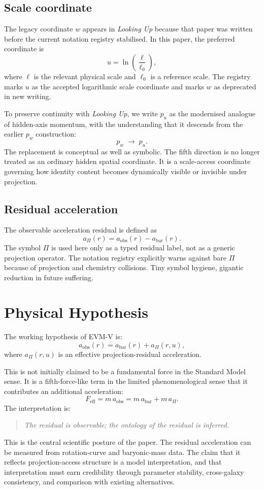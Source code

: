 \documentclass[11pt,a4paper,oneside]{article}
\newcommand{\aobs}{a_{\mathrm{obs}}}
\newcommand{\abar}{a_{\mathrm{bar}}}
\newcommand{\aPi}{a_{\Pi}}
\newcommand{\pu}{p_u}
\newcommand{\pw}{p_w}      %
\newcommand{\usc}{u}                    %
\newcommand{\ellz}{\ell_0}             %
\begin{document}
\subsection{Scale coordinate}

The legacy coordinate $w$ appears in \emph{Looking Up} because that paper was written
before the current notation registry stabilised. In this paper, the preferred coordinate
is
\[
    \usc = \ln\!\left(\frac{\ell}{\ellz}\right),
\]
where $\ell$ is the relevant physical scale and $\ellz$ is a reference scale. The
registry marks $\usc$ as the accepted logarithmic scale coordinate and marks $w$ as
deprecated in new writing.

To preserve continuity with \emph{Looking Up}, we write $\pu$ as the modernised analogue
of hidden-axis momentum, with the understanding that it descends from the earlier $\pw$
construction:
\[
    \pw \;\longrightarrow\; \pu.
\]
The replacement is conceptual as well as symbolic. The fifth direction is no longer
treated as an ordinary hidden spatial coordinate. It is a scale-access coordinate
governing how identity content becomes dynamically visible or invisible under projection.

\subsection{Residual acceleration}

The observable acceleration residual is defined as
\[
    \aPi(r) = \aobs(r) - \abar(r).
\]
The symbol $\Pi$ is used here only as a typed residual label, not as a generic
projection operator. The notation registry explicitly warns against bare $\Pi$ because
of projection and chemistry collisions. Tiny symbol hygiene, gigantic reduction in
future suffering.

\section{Physical Hypothesis}

The working hypothesis of EVM-V is:
\[
    \aobs(r) = \abar(r) + \aPi(r,\usc),
\]
where $\aPi(r,\usc)$ is an effective projection-residual acceleration.

This is not initially claimed to be a fundamental force in the Standard Model sense.
It is a fifth-force-like term in the limited phenomenological sense that it contributes
an additional acceleration:
\[
    F_{\mathrm{eff}} = m\,\aobs = m\,\abar + m\,\aPi.
\]
The interpretation is:
\begin{quote}
\textit{The residual is observable; the ontology of the residual is inferred.}
\end{quote}
This is the central scientific posture of the paper. The residual acceleration can be
measured from rotation-curve and baryonic-mass data. The claim that it reflects
projection-access structure is a model interpretation, and that interpretation must earn
credibility through parameter stability, cross-galaxy consistency, and comparison with
existing alternatives.
\end{document}
